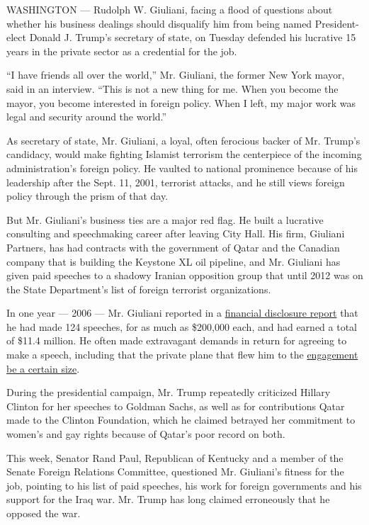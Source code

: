 WASHINGTON --- Rudolph W. Giuliani, facing a flood of questions about
whether his business dealings should disqualify him from being named
President-elect Donald J. Trump's secretary of state, on Tuesday
defended his lucrative 15 years in the private sector as a credential
for the job.

``I have friends all over the world,'' Mr. Giuliani, the former New York
mayor, said in an interview. ``This is not a new thing for me. When you
become the mayor, you become interested in foreign policy. When I left,
my major work was legal and security around the world.''

As secretary of state, Mr. Giuliani, a loyal, often ferocious backer of
Mr. Trump's candidacy, would make fighting Islamist terrorism the
centerpiece of the incoming administration's foreign policy. He vaulted
to national prominence because of his leadership after the Sept. 11,
2001, terrorist attacks, and he still views foreign policy through the
prism of that day.

But Mr. Giuliani's business ties are a major red flag. He built a
lucrative consulting and speechmaking career after leaving City Hall.
His firm, Giuliani Partners, has had contracts with the government of
Qatar and the Canadian company that is building the Keystone XL oil
pipeline, and Mr. Giuliani has given paid speeches to a shadowy Iranian
opposition group that until 2012 was on the State Department's list of
foreign terrorist organizations.

In one year --- 2006 --- Mr. Giuliani reported in a
\href{http://www.nytimes3xbfgragh.onion/2007/05/17/us/politics/17candidates.html}{financial
disclosure report} that he had made 124 speeches, for as much as
\$200,000 each, and had earned a total of \$11.4 million. He often made
extravagant demands in return for agreeing to make a speech, including
that the private plane that flew him to the
\href{http://www.thesmokinggun.com/file/rudy-giuliani-no-free-speech?page=0}{engagement
be a certain size}.

During the presidential campaign, Mr. Trump repeatedly criticized
Hillary Clinton for her speeches to Goldman Sachs, as well as for
contributions Qatar made to the Clinton Foundation, which he claimed
betrayed her commitment to women's and gay rights because of Qatar's
poor record on both.

This week, Senator Rand Paul, Republican of Kentucky and a member of the
Senate Foreign Relations Committee, questioned Mr. Giuliani's fitness
for the job, pointing to his list of paid speeches, his work for foreign
governments and his support for the Iraq war. Mr. Trump has long claimed
erroneously that he opposed the war.

